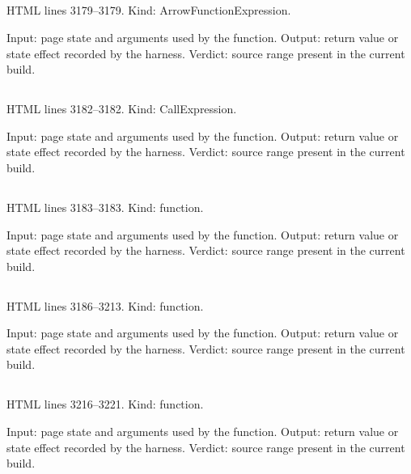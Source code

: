 \subsection*{\texttt{}}
\label{vf_95_safeName}
HTML lines 3179--3179. Kind: ArrowFunctionExpression.

Input: page state and arguments used by the function.
Output: return value or state effect recorded by the harness.
Verdict: source range present in the current build.

\subsection*{\texttt{}}
\label{vf_96_CRC_T}
HTML lines 3182--3182. Kind: CallExpression.

Input: page state and arguments used by the function.
Output: return value or state effect recorded by the harness.
Verdict: source range present in the current build.

\subsection*{\texttt{}}
\label{vf_97_crc32}
HTML lines 3183--3183. Kind: function.

Input: page state and arguments used by the function.
Output: return value or state effect recorded by the harness.
Verdict: source range present in the current build.

\subsection*{\texttt{}}
\label{vf_98_MD5}
HTML lines 3186--3213. Kind: function.

Input: page state and arguments used by the function.
Output: return value or state effect recorded by the harness.
Verdict: source range present in the current build.

\subsection*{\texttt{}}
\label{vf_99_inflateRaw}
HTML lines 3216--3221. Kind: function.

Input: page state and arguments used by the function.
Output: return value or state effect recorded by the harness.
Verdict: source range present in the current build.

